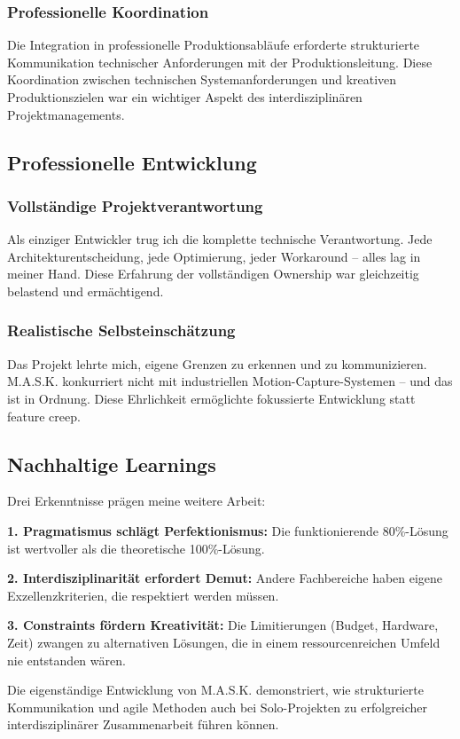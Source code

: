 \subsubsection{Professionelle Koordination}

Die Integration in professionelle Produktionsabläufe erforderte strukturierte Kommunikation technischer Anforderungen mit der Produktionsleitung. Diese Koordination zwischen technischen Systemanforderungen und kreativen Produktionszielen war ein wichtiger Aspekt des interdisziplinären Projektmanagements.

\subsection{Professionelle Entwicklung}

\subsubsection{Vollständige Projektverantwortung}

Als einziger Entwickler trug ich die komplette technische Verantwortung. Jede Architekturentscheidung, jede Optimierung, jeder Workaround – alles lag in meiner Hand. Diese Erfahrung der vollständigen Ownership war gleichzeitig belastend und ermächtigend.

\subsubsection{Realistische Selbsteinschätzung}

Das Projekt lehrte mich, eigene Grenzen zu erkennen und zu kommunizieren. M.A.S.K. konkurriert nicht mit industriellen Motion-Capture-Systemen – und das ist in Ordnung. Diese Ehrlichkeit ermöglichte fokussierte Entwicklung statt feature creep.

\subsection{Nachhaltige Learnings}

Drei Erkenntnisse prägen meine weitere Arbeit:

\textbf{1. Pragmatismus schlägt Perfektionismus:} Die funktionierende 80\%-Lösung ist wertvoller als die theoretische 100\%-Lösung.

\textbf{2. Interdisziplinarität erfordert Demut:} Andere Fachbereiche haben eigene Exzellenzkriterien, die respektiert werden müssen.

\textbf{3. Constraints fördern Kreativität:} Die Limitierungen (Budget, Hardware, Zeit) zwangen zu alternativen Lösungen, die in einem ressourcenreichen Umfeld nie entstanden wären.

Die eigenständige Entwicklung von M.A.S.K. demonstriert, wie strukturierte Kommunikation und agile Methoden auch bei Solo-Projekten zu erfolgreicher interdisziplinärer Zusammenarbeit führen können.
